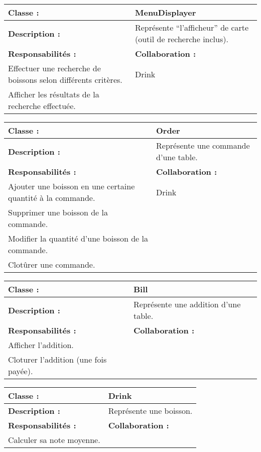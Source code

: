 \begin{center}
\vspace{0.5cm}

\begin{tabular}{|p{6cm}p{6cm}|}
	\hline
		\textbf{Classe :} & MenuDisplayer \\
	\hline
		\textbf{Description :} & Représente ``l'afficheur'' de carte (outil de recherche
		inclus). \\
	\hline
		\textbf{Responsabilités :} & \textbf{Collaboration :} \\
		Effectuer une recherche de boissons selon
		différents critères. & Drink \\
		Afficher les résultats de la recherche effectuée. & \\
	\hline		
\end{tabular}

\vspace{0.5cm}

\begin{tabular}{|p{6cm}p{6cm}|}
	\hline
		\textbf{Classe :} & Order \\
	\hline
		\textbf{Description :} & Représente une commande d'une table. \\
	\hline
		\textbf{Responsabilités :} & \textbf{Collaboration :} \\
		Ajouter une boisson en une certaine quantité à la commande. & Drink \\
		Supprimer une boisson de la commande. & \\
		Modifier la quantité d'une boisson de la commande. & \\
		Clotûrer une commande. & \\
	\hline		
\end{tabular}

\vspace{0.5cm}

\begin{tabular}{|p{6cm}p{6cm}|}
	\hline
		\textbf{Classe :} & Bill \\
	\hline
		\textbf{Description :} & Représente une addition d'une table. \\
	\hline
		\textbf{Responsabilités :} & \textbf{Collaboration :} \\
		Afficher l'addition. & \\
		Cloturer l'addition (une fois payée). & \\
	\hline		
\end{tabular}

\vspace{0.5cm}

\begin{tabular}{|p{6cm}p{6cm}|}
	\hline
		\textbf{Classe :} & Drink \\
	\hline
		\textbf{Description :} & Représente une boisson. \\
	\hline
		\textbf{Responsabilités :} & \textbf{Collaboration :} \\
		Calculer sa note moyenne. & \\
	\hline		
\end{tabular}

\vspace{0.5cm}

\end{center}

